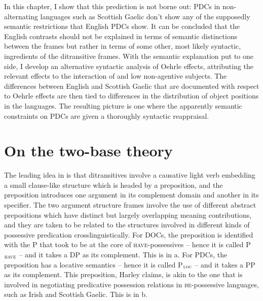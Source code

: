 \documentclass[output=paper,colorlinks,citecolor=brown]{langscibook}
\begin{document}
In this chapter, I show that this prediction is not borne out: PDCs in non-alternating languages such as Scottish Gaelic don't show any of the supposedly semantic restrictions that English PDCs show. It can be concluded that the English contrasts should not be explained in terms of semantic distinctions between the frames but rather in terms of some other, most likely syntactic, ingredients of the ditransitive frames. With the semantic explanation put to one side, I develop an alternative syntactic analysis of Oehrle effects, attributing the relevant effects to the interaction of  and low non-agentive subjects. The differences between English and Scottish Gaelic that are documented with respect to Oehrle effects are then tied to differences in the distribution of object positions in the languages. The resulting picture is one where the apparently semantic constraints on PDCs are given a thoroughly syntactic reappraisal. 

\section{On the two-base theory}

The leading idea in \citet{gt:Harley:2002a} is that ditransitives involve a causative light verb embedding a small clause-like structure which is headed by a preposition, and the preposition introduces one argument in its complement domain and another in its specifier. The two argument structure frames involve the use of different abstract prepositions which have distinct but largely overlapping meaning contributions, and they are taken to be related to the structures involved in different kinds of possessive predication crosslinguistically. For DOCs, the preposition is identified with the P that \citet{gt:Kayne:1993} took to be at the core of \textsc{have}-possessives -- hence it is called  P$_{\textsc{have}}$ -- and it takes a DP as its complement. This is in a. For PDCs, the preposition has a locative semantics -- hence it is called P$_{\textsc{loc}}$ -- and it takes a PP as its complement. This preposition, Harley claims, is akin to the one that is involved in negotiating predicative possession relations in \textsc{be}-possessive languages, such as Irish and Scottish Gaelic. This is in b. 
\end{document}
